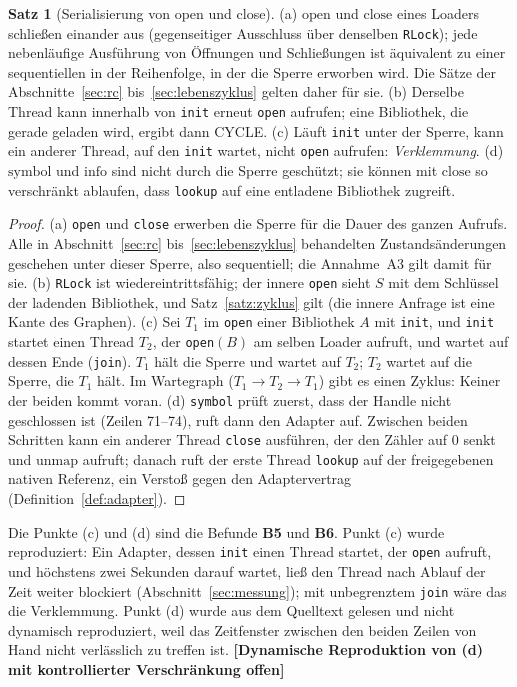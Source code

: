 \documentclass[a4paper,12pt,twoside]{report}
\DeclareRobustCommand{\_}{\ifmmode\mbox{\textunderscore}\else\textunderscore\allowbreak{}\fi}
\theoremstyle{definition}
\newtheorem{satz}{Satz}[chapter]
\newcommand{\offen}[1]{\textcolor{accentred}{\textbf{[#1]}}}
\newcommand{\Bf}[1]{\textbf{B#1}}
\begin{document}
\begin{satz}[Serialisierung von open und close]
	\label{satz:nebenlaeufig}
	(a) $\mathrm{open}$ und $\mathrm{close}$ eines Loaders schließen einander aus (gegenseitiger Ausschluss über denselben \texttt{RLock}); jede nebenläufige Ausführung von Öffnungen und Schließungen ist äquivalent zu einer sequentiellen in der Reihenfolge, in der die Sperre erworben wird. Die Sätze der Abschnitte~\ref{sec:rc} bis~\ref{sec:lebenszyklus} gelten daher für sie. (b) Derselbe Thread kann innerhalb von \texttt{init} erneut \texttt{open} aufrufen; eine Bibliothek, die gerade geladen wird, ergibt dann CYCLE. (c) Läuft \texttt{init} unter der Sperre, kann ein anderer Thread, auf den \texttt{init} wartet, nicht \texttt{open} aufrufen: \emph{Verklemmung}. (d) $\mathrm{symbol}$ und $\mathrm{info}$ sind nicht durch die Sperre geschützt; sie können mit $\mathrm{close}$ so verschränkt ablaufen, dass \texttt{lookup} auf eine entladene Bibliothek zugreift.
\end{satz}

\begin{proof}
	(a) \texttt{open} und \texttt{close} erwerben die Sperre für die Dauer des ganzen Aufrufs. Alle in Abschnitt~\ref{sec:rc} bis~\ref{sec:lebenszyklus} behandelten Zustandsänderungen geschehen unter dieser Sperre, also sequentiell; die Annahme~A3 gilt damit für sie. (b) \texttt{RLock} ist wiedereintrittsfähig; der innere \texttt{open} sieht $S$ mit dem Schlüssel der ladenden Bibliothek, und Satz~\ref{satz:zyklus} gilt (die innere Anfrage ist eine Kante des Graphen). (c) Sei $T_1$ im \texttt{open} einer Bibliothek $A$ mit \texttt{init}, und \texttt{init} startet einen Thread $T_2$, der \texttt{open}$(B)$ am selben Loader aufruft, und wartet auf dessen Ende (\texttt{join}). $T_1$ hält die Sperre und wartet auf $T_2$; $T_2$ wartet auf die Sperre, die $T_1$ hält. Im Wartegraph ($T_1\to T_2\to T_1$) gibt es einen Zyklus: Keiner der beiden kommt voran. (d) \texttt{symbol} prüft zuerst, dass der Handle nicht geschlossen ist (Zeilen 71--74), ruft dann den Adapter auf. Zwischen beiden Schritten kann ein anderer Thread \texttt{close} ausführen, der den Zähler auf $0$ senkt und $\mathrm{unmap}$ aufruft; danach ruft der erste Thread \texttt{lookup} auf der freigegebenen nativen Referenz, ein Verstoß gegen den Adaptervertrag (Definition~\ref{def:adapter}).
\end{proof}

Die Punkte (c) und (d) sind die Befunde \Bf{5} und \Bf{6}. Punkt (c) wurde reproduziert: Ein Adapter, dessen \texttt{init} einen Thread startet, der \texttt{open} aufruft, und höchstens zwei Sekunden darauf wartet, ließ den Thread nach Ablauf der Zeit weiter blockiert (Abschnitt~\ref{sec:messung}); mit unbegrenztem \texttt{join} wäre das die Verklemmung. Punkt (d) wurde aus dem Quelltext gelesen und nicht dynamisch reproduziert, weil das Zeitfenster zwischen den beiden Zeilen von Hand nicht verlässlich zu treffen ist. \offen{Dynamische Reproduktion von (d) mit kontrollierter Verschränkung offen}
\end{document}
